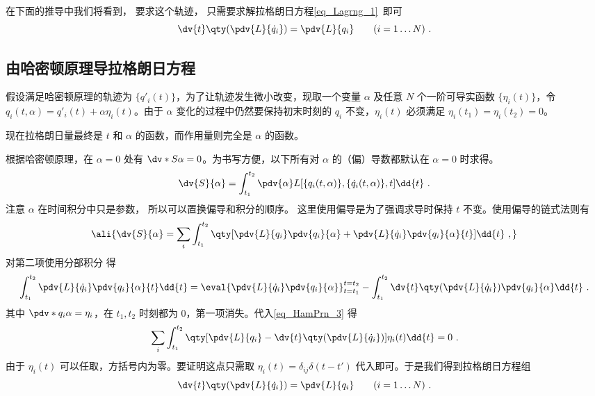 在下面的推导中我们将看到， 要求这个轨迹， 只需要求解拉格朗日方程\autoref{eq_Lagrng_1}~即可
\begin{equation}\label{eq_HamPrn_4}
\dv{t} \qty(\pdv{L}{\dot q_i}) = \pdv{L}{q_i} \qquad
(i = 1\dots N)~.
\end{equation}

\subsection{由哈密顿原理导拉格朗日方程}

假设满足哈密顿原理的轨迹为 $\{q'_i(t)\}$，为了让轨迹发生微小改变，现取一个变量 $\alpha$ 及任意 $N$ 个一阶可导实函数 $\{\eta_i(t)\}$，令 $q_i(t,\alpha ) = q'_i(t) + \alpha \eta_i(t)$。由于 $\alpha$ 变化的过程中仍然要保持初末时刻的 $q_i$ 不变，$\eta_i(t)$ 必须满足 $\eta_i(t_1) = \eta_i(t_2) = 0$。

现在拉格朗日量最终是 $t$ 和 $\alpha$ 的函数，而作用量则完全是 $\alpha$ 的函数。
 
根据哈密顿原理，在 $\alpha = 0$ 处有 $\dv*{S}{\alpha} = 0$。为书写方便，以下所有对 $\alpha$ 的（偏）导数都默认在 $\alpha=0$ 时求得。
\begin{equation}
\dv{S}{\alpha} = \int_{t_1}^{t_2} \pdv{\alpha} L[\{q_i(t,\alpha )\}, \{\dot q_i(t,\alpha)\}, t] \dd{t}~.
\end{equation}
注意 $\alpha$ 在时间积分中只是参数， 所以可以置换偏导和积分的顺序。 %
这里使用偏导是为了强调求导时保持 $t$ 不变。使用偏导的链式法则有
\begin{equation}\label{eq_HamPrn_3}
\ali{
\dv{S}{\alpha} =
\sum_i \int_{t_1}^{t_2} \qty[\pdv{L}{q_i} \pdv{q_i}{\alpha} + \pdv{L}{\dot q_i}\pdv{q_i}{\alpha}{t}] \dd{t}~,
}\end{equation}
对第二项使用分部积分 得
\begin{equation}
\int_{t_1}^{t_2} \pdv{L}{\dot q_i} \pdv{q_i}{\alpha}{t} \dd{t}  = \eval{\pdv{L}{\dot q_i}\pdv{q_i}{\alpha}}_{t = t_1}^{t = t_2} - \int_{t_1}^{t_2} \dv{t} \qty(\pdv{L}{\dot q_i})\pdv{q_i}{\alpha} \dd{t}~.
\end{equation}
其中 $\pdv*{q_i}{\alpha}  = \eta_i$，在 $t_1, t_2$ 时刻都为 0，第一项消失。代入\autoref{eq_HamPrn_3} 得
\begin{equation}
\sum_i \int_{t_1}^{t_2} \qty[\pdv{L}{q_i} - \dv{t} \qty(\pdv{L}{\dot q_i})] \eta_i(t) \dd{t} = 0~.
\end{equation}
由于 $\eta_i(t)$ 可以任取，方括号内为零。要证明这点只需取 $\eta_i(t) = \delta_{ij}\delta(t - t')$ 代入即可。于是我们得到拉格朗日方程组
\begin{equation}\label{eq_HamPrn_2}
\dv{t} \qty(\pdv{L}{\dot q_i}) = \pdv{L}{q_i} \qquad
(i = 1\dots N)~.
\end{equation}
